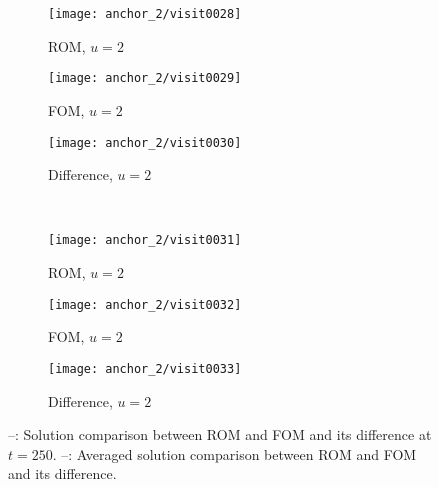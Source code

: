 \begin{figure}[!h]
     \centering
     \begin{subfigure}[b]{0.3\textwidth}
         \centering
         \texttt{[image: anchor\_2/visit0028]}
         \caption{ROM, $u=2$}
         \label{fig:6_a}
     \end{subfigure}
     \hfill
     \begin{subfigure}[b]{0.3\textwidth}
         \centering
         \texttt{[image: anchor\_2/visit0029]}
         \caption{FOM, $u=2$}
         \label{fig:6_b}
     \end{subfigure}
     \hfill
     \begin{subfigure}[b]{0.3\textwidth}
         \centering
         \texttt{[image: anchor\_2/visit0030]}
         \caption{Difference, $u=2$}
         \label{fig:6_c}
     \end{subfigure}\\
     \begin{subfigure}[b]{0.3\textwidth}
         \centering
         \texttt{[image: anchor\_2/visit0031]}
         \caption{ROM, $u=2$}
         \label{fig:6_d}
     \end{subfigure}
     \hfill
     \begin{subfigure}[b]{0.3\textwidth}
         \centering
         \texttt{[image: anchor\_2/visit0032]}
         \caption{FOM, $u=2$}
         \label{fig:6_e}
     \end{subfigure}
     \hfill
     \begin{subfigure}[b]{0.3\textwidth}
         \centering
         \texttt{[image: anchor\_2/visit0033]}
         \caption{Difference, $u=2$}
         \label{fig:6_f}
     \end{subfigure} 
     \caption{--: Solution comparison between
     ROM and FOM and its difference at $t=250$.
     --: Averaged solution comparison between
     ROM and FOM and its difference.}
      \label{fig:6}
\end{figure}
